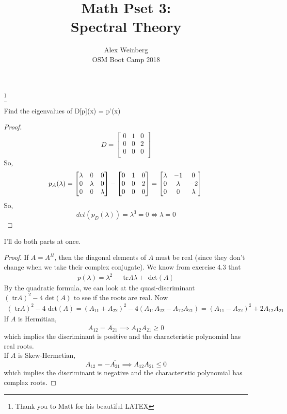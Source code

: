 \documentclass[12pt]{amsart}
\title{Math Pset 3:\\
       Spectral Theory}
\author{Alex Weinberg \\
        OSM Boot Camp 2018}
\newenvironment{problem}[2][Problem]{\begin{trivlist}
\item[\hskip \labelsep {\bfseries #1}\hskip \labelsep {\bfseries #2.}]}{\end{trivlist}}
\begin{document}
\maketitle \footnote{Thank you to Matt for his beautiful LATEX}


\begin{problem}{2} Find the eigenvalues of D[p](x) = p'(x)
\end{problem}
\begin{proof}
    \[
 D =   \begin{bmatrix}
    0 & 1 & 0 \\
    0 & 0 & 2 \\
    0 & 0 & 0 \\
    \end{bmatrix}
    \]
    So, \[ p_A(\lambda) =
   \begin{bmatrix}
    \lambda & 0 & 0 \\
    0 & \lambda & 0 \\
    0 & 0 & \lambda \\
    \end{bmatrix} -
    \begin{bmatrix}
    0 & 1 & 0 \\
    0 & 0 & 2 \\
    0 & 0 & 0 \\
\end{bmatrix} =
\begin{bmatrix}
    \lambda & -1 & 0 \\
    0 & \lambda & -2 \\
    0 & 0 & \lambda \\
\end{bmatrix}\\
\]
So, \[
det(p_D(\lambda)) = \lambda^3 =0 \iff \lambda=0
\]
\end{proof}

\begin{problem}{4} I'll do both parts at once. \\
\begin{proof} If $A = A^H$, then the diagonal elements of $A$ must be real (since they don't change when we take their complex conjugate). We know from exercise 4.3 that
\begin{align*}
p(\lambda ) = \lambda^2 - \text{ tr}A\lambda + \text{ det} (A)
\end{align*}
By the quadratic formula, we can look at the quasi-discriminant $(\text{ tr}A)^2 - 4\text{ det} (A)$ to see if the roots are real. Now
\begin{align*}
(\text{ tr}A)^2 - 4\text{ det} (A) = (A_{11} + A_{22})^2 - 4(A_{11}A_{22} - A_{12}A_{21}) = (A_{11} - A_{22})^2 + 2A_{12} A_{21}
\end{align*}
If $A$ is Hermitian,
$$A_{12} = \overline{A_{21}} \implies A_{12}A_{21} \geq 0 $$
which implies the discriminant is positive and the characteristic polynomial has real roots. \\
If $A$ is Skew-Hermetian,
$$A_{12} = - \overline{A_{21}} \implies A_{12}A_{21} \leq 0 $$
which implies the discriminant is negative and the characteristic polynomial has complex roots.
\end{proof}
\end{problem}
\end{document}
